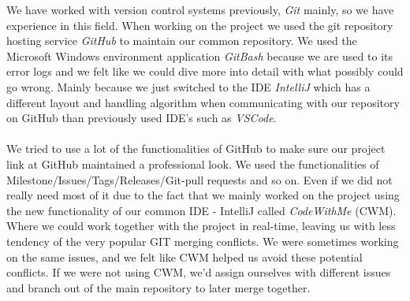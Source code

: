 \documentclass[main.tex]{subfiles}
\begin{document}
We have worked with version control systems previously, \textit{Git} mainly, so we have experience in this field. When working on the project we used the git repository hosting service \textit{GitHub} to maintain our common repository. We used the Microsoft Windows environment application \textit{GitBash} because we are used to its error logs and we felt like we could dive more into detail with what possibly could go wrong. Mainly because we just switched to the IDE \textit{IntelliJ} which has a different layout and handling algorithm when communicating with our repository on GitHub than previously used IDE’s such as \textit{VSCode}.
\\ \\
We tried to use a lot of the functionalities of GitHub to make sure our project link at GitHub maintained a professional look. We used the functionalities of Milestone/Issues/Tags/Releases/Git-pull requests and so on. Even if we did not really need most of it due to the fact that we mainly worked on the project using the new functionality of our common IDE - IntelliJ called \textit{CodeWithMe} (CWM). Where we could work together with the project in real-time, leaving us with less tendency of the very popular GIT merging conflicts. We were sometimes working on the same issues, and we felt like CWM helped us avoid these potential conflicts.
If we were not using CWM, we’d assign ourselves with different issues and branch out of the main repository to later merge together.
\end{document}
